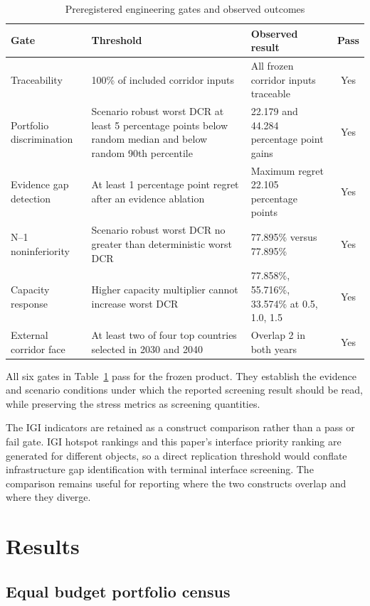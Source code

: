 \documentclass{ieeeaccess}
\newcommand{\DCR}{DCR}
\begin{document}
\begin{table}[t]
\centering
\caption{Preregistered engineering gates and observed outcomes}
\label{tab:gates}
\scriptsize
\begin{tabularx}{\textwidth}{p{3.4cm}p{4.5cm}Xc}
\toprule
Gate & Threshold & Observed result & Pass \\
\midrule
Traceability & 100\% of included corridor inputs & All frozen corridor inputs traceable & Yes \\
Portfolio discrimination & Scenario robust worst \DCR{} at least 5 percentage points below random median and below random 90th percentile & 22.179 and 44.284 percentage point gains & Yes \\
Evidence gap detection & At least 1 percentage point regret after an evidence ablation & Maximum regret 22.105 percentage points & Yes \\
N--1 noninferiority & Scenario robust worst \DCR{} no greater than deterministic worst \DCR{} & 77.895\% versus 77.895\% & Yes \\
Capacity response & Higher capacity multiplier cannot increase worst \DCR{} & 77.858\%, 55.716\%, 33.574\% at 0.5, 1.0, 1.5 & Yes \\
External corridor face & At least two of four top countries selected in 2030 and 2040 & Overlap 2 in both years & Yes \\
\bottomrule
\end{tabularx}
\end{table}

All six gates in Table~\ref{tab:gates} pass for the frozen product. They establish the evidence and scenario conditions under which the reported screening result should be read, while preserving the stress metrics as screening quantities.

The IGI indicators are retained as a construct comparison rather than a pass or fail gate. IGI hotspot rankings and this paper's interface priority ranking are generated for different objects, so a direct replication threshold would conflate infrastructure gap identification with terminal interface screening. The comparison remains useful for reporting where the two constructs overlap and where they diverge.

\section{Results}
\label{sec:results}

\subsection{Equal budget portfolio census}
\end{document}
